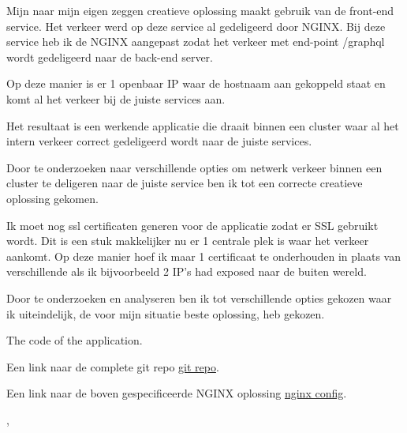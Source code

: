 {{{			Mijn naar mijn eigen zeggen creatieve oplossing maakt gebruik van de front-end service.
			Het verkeer werd op deze service al gedeligeerd door NGINX.
			Bij deze service heb ik de NGINX aangepast zodat het verkeer met end-point /graphql wordt gedeligeerd naar de back-end server.

			Op deze manier is er 1 openbaar IP waar de hostnaam aan gekoppeld staat en komt al het verkeer bij de juiste services aan.

		}
		{%
			Het resultaat is een werkende applicatie die draait binnen een cluster waar al het intern verkeer correct gedeligeerd wordt naar de juiste services.
		}
		{%
			Door te onderzoeken naar verschillende opties om netwerk verkeer binnen een cluster te deligeren naar de juiste service ben ik tot een correcte creatieve oplossing gekomen.

			Ik moet nog ssl certificaten generen voor de applicatie zodat er SSL gebruikt wordt.
			Dit is een stuk makkelijker nu er 1 centrale plek is waar het verkeer aankomt.
			Op deze manier hoef ik maar 1 certificaat te onderhouden in plaats van verschillende als ik bijvoorbeeld 2 IP's had exposed naar de buiten wereld.

			Door te onderzoeken en analyseren ben ik tot verschillende opties gekozen waar ik uiteindelijk, de voor mijn situatie beste oplossing, heb gekozen.

		}
		{
			The code of the application.
		}
	}
	{%
		Een link naar de complete git repo \href{https://github.com/aladante/product_inventaris}{git repo}.

		Een link naar de boven gespecificeerde NGINX oplossing \href{https://github.com/aladante/product_inventaris/blob/main/front-end/nginx/nginx.conf}{nginx config}.
	},
}
